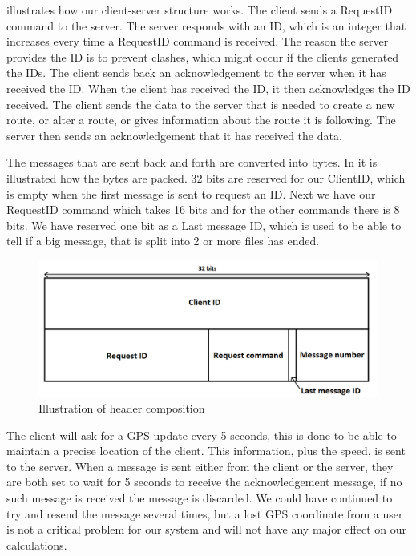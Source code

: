  illustrates how our client-server structure works.
The client sends a RequestID command to the server.
The server responds with an ID, which is an integer that increases every time a RequestID command is received.
The reason the server provides the ID is to prevent clashes, which might occur if the clients generated the IDs.
The client sends back an acknowledgement to the server when it has received the ID.
When the client has received the ID, it then acknowledges the ID received.
The client sends the data to the server that is needed to create a new route,
or alter a route, or gives information about the route it is following.
The server then sends an acknowledgement that it has received the data.


The messages that are sent back and forth are converted into bytes.
In  it is illustrated how the bytes are packed.
32 bits are reserved for our ClientID, which is empty when the first message is sent to request an ID.
Next we have our RequestID command which takes 16 bits and for the other commands there is 8 bits.
We have reserved one bit as a Last message ID, which is used to be able to tell if a big message,
that is split into 2 or more files has ended.

\begin{figure}[h!]
  \centering
    \includegraphics[width=1\textwidth]{figures/bytesclientserver.png}
    \caption{Illustration of header composition}
    \label{fig:bytesclientserver}
\end{figure}

The client will ask for a GPS update every 5 seconds, this is done to be able to maintain a precise location of the client. This information, plus the speed, is sent to the server.
When a message is sent either from the client or the server,
they are both set to wait for 5 seconds to receive the acknowledgement message, if no such message is received the message is discarded. We could have continued to try and resend the message several times, but a lost GPS coordinate from a user is not a critical problem for our system and will not have any major effect on our calculations.

